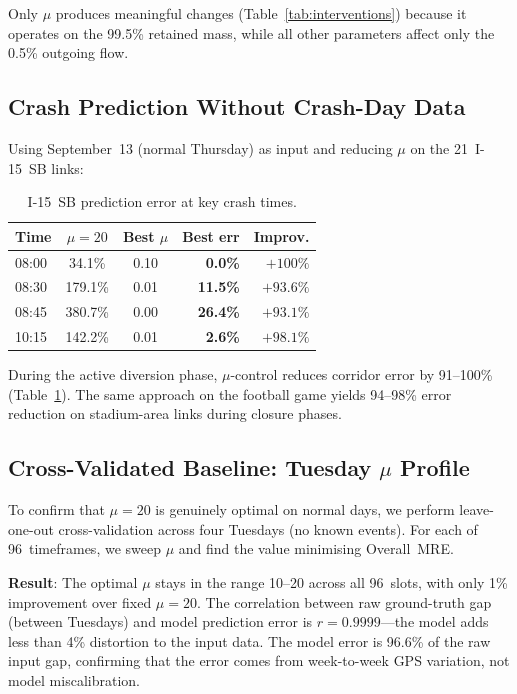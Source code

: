\documentclass[11pt]{article}
\begin{document}
Only $\mu$ produces meaningful changes (Table~\ref{tab:interventions}) because it operates on the 99.5\% retained mass, while all other parameters affect only the 0.5\% outgoing flow.

\subsection{Crash Prediction Without Crash-Day Data}

Using September~13 (normal Thursday) as input and reducing $\mu$ on the 21~I-15~SB links:

\begin{table}[t]
\centering
\caption{I-15~SB prediction error at key crash times.}
\label{tab:mu_crash}
\small
\begin{tabular}{lccrr}
\toprule
Time & $\mu{=}20$ & Best $\mu$ & Best err & Improv. \\
\midrule
08:00 & 34.1\% & 0.10 & \textbf{0.0\%} & $+100\%$ \\
08:30 & 179.1\% & 0.01 & \textbf{11.5\%} & $+93.6\%$ \\
08:45 & 380.7\% & 0.00 & \textbf{26.4\%} & $+93.1\%$ \\
10:15 & 142.2\% & 0.01 & \textbf{2.6\%} & $+98.1\%$ \\
\bottomrule
\end{tabular}
\end{table}

During the active diversion phase, $\mu$-control reduces corridor error by 91--100\% (Table~\ref{tab:mu_crash}).
The same approach on the football game yields 94--98\% error reduction on stadium-area links during closure phases.

\subsection{Cross-Validated Baseline: Tuesday $\mu$ Profile}

To confirm that $\mu = 20$ is genuinely optimal on normal days, we perform leave-one-out cross-validation across four Tuesdays (no known events).
For each of 96~timeframes, we sweep $\mu$ and find the value minimising Overall~MRE.

\textbf{Result}: The optimal $\mu$ stays in the range 10--20 across all 96~slots, with only 1\% improvement over fixed $\mu = 20$.
The correlation between raw ground-truth gap (between Tuesdays) and model prediction error is $r = 0.9999$---the model adds less than 4\% distortion to the input data.
The model error is 96.6\% of the raw input gap, confirming that the error comes from week-to-week GPS variation, not model miscalibration.
\end{document}

